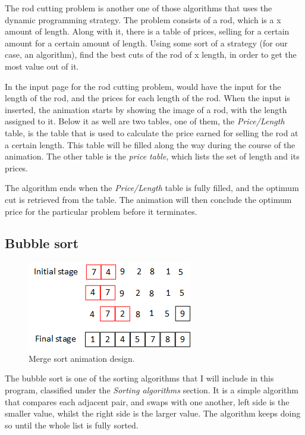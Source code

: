 The rod cutting problem is another one of those algorithms that uses the dynamic programming strategy. The problem consists of a rod, which is a x amount of length. Along with it, there is a table of prices, selling for a certain amount for a certain amount of length. Using some sort of a strategy (for our case, an algorithm), find the best cuts of the rod of x length, in order to get the most value out of it.

In the input page for the rod cutting problem, would have the input for the length of the rod, and the prices for each length of the rod. When the input is inserted, the animation starts by showing the image of a rod, with the length assigned to it. Below it as well are two tables, one of them, the \textit{Price/Length} table, is the table that is used to calculate the price earned for selling the rod at a certain length. This table will be filled along the way during the course of the animation. The other table is the \textit{price table}, which lists the set of length and its prices. 

The algorithm ends when the \textit{Price/Length} table is fully filled, and the optimum cut is retrieved from the table. The animation will then conclude the optimum price for the particular problem before it terminates.


\newpage

\subsection{Bubble sort}

\begin{figure}[H]
\centering
\includegraphics[scale=1.5]{images/report_images/animationDesignBubbleSort.png}
\caption{Merge sort animation design.}
\label{animationDesignBubbleSort}
\end{figure}

The bubble sort is one of the sorting algorithms that I will include in this program, classified under the \textit{Sorting algorithms} section. It is a simple algorithm that compares each adjacent pair, and swaps with one another, left side is the smaller value, whilst the right side is the larger value. The algorithm keeps doing so until the whole list is fully sorted.

